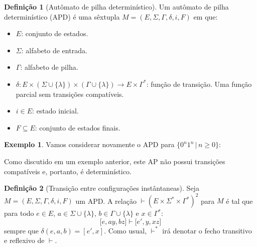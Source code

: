 \documentclass[a4paper]{article}
\theoremstyle{definition}
\newtheorem{Example}{Exemplo}
\newtheorem{Definition}{Definição}
\begin{document}
  \begin{Definition}[Autômato de pilha determinístico]
    Um autômato de pilha determinístico (APD) é uma sêxtupla
    $M=(E,\Sigma,\Gamma,\delta,i,F)$ em que:
    \begin{itemize}
       \item $E$: conjunto de estados.
       \item $\Sigma$: alfabeto de entrada.
       \item $\Gamma$: alfabeto de pilha.
       \item $\delta : E \times (\Sigma \cup \{\lambda\}) \times (\Gamma \cup
    \{\lambda\}) \to E \times \Gamma^*$: função de transição. Uma função parcial
    sem transições compatíveis.
       \item $i \in E$: estado inicial.
       \item $F\subseteq E$: conjunto de estados finais.
    \end{itemize}
  \end{Definition}

   \begin{Example}
    Vamos considerar novamente o APD para $\{0^n1^n\,|\,n \geq 0\}$:
    \begin{figure}[H]
      \centering
    \end{figure}
    Como discutido em um exemplo anterior, este AP não possui transições
    compatíveis e, portanto, é determinístico.
  \end{Example}
 
  
  \begin{Definition}[Transição entre configurações instântaneas]
    Seja $M=(E,\Sigma,\Gamma,\delta,i,F)$ um APD. A relação $\vdash(E \times
    \Sigma^* \times \Gamma^*)^2$ para $M$ é tal que para todo $e\in E$,
    $a\in \Sigma\cup\{\lambda\}$, $b\in \Gamma\cup\{\lambda\}$ e $x \in
    \Gamma^*$:
    \[
      \lbrack e, ay, bz \rbrack \vdash \lbrack e', y, xz \rbrack
    \]
    sempre que $\delta(e,a,b) = [e',x]$. Como usual, $\vdash^*$ irá denotar
    o fecho transitivo e reflexivo de $\vdash$.
  \end{Definition}
\end{document}
